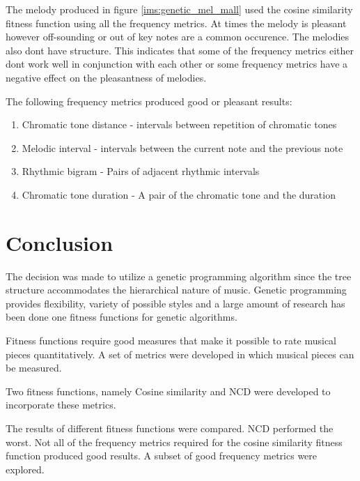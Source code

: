 The melody produced in figure \ref{ims:genetic_mel_mall} used the cosine similarity fitness function using all the frequency metrics. At times the melody is pleasant however off-sounding or out of key notes are a common occurence. The melodies also dont have structure. This indicates that some of the frequency metrics either dont work well in conjunction with each other or some frequency metrics have a negative effect on the pleasantness of melodies. 

The following frequency metrics produced good or pleasant results:
\begin{enumerate}
\item Chromatic tone distance - intervals between repetition of chromatic tones
\item Melodic interval - intervals between the current note and the previous note
\item Rhythmic bigram - Pairs of adjacent rhythmic intervals
\item Chromatic tone duration - A pair of the chromatic tone and the duration
\end{enumerate}


\section{Conclusion}

The decision was made to utilize a genetic programming algorithm since the tree structure accommodates the hierarchical nature of music. Genetic programming provides flexibility, variety of possible styles and a large amount of research has been done one fitness functions for genetic algorithms.

Fitness functions require good measures that make it possible to rate musical pieces quantitatively. A set of metrics were developed in which musical pieces can be measured.

Two fitness functions, namely Cosine similarity and \ac{NCD} were developed to incorporate these metrics.

The results of different fitness functions were compared. \ac{NCD} performed the worst. Not all of the frequency metrics required for the cosine similarity fitness function produced good results. A subset of good frequency metrics were explored.

